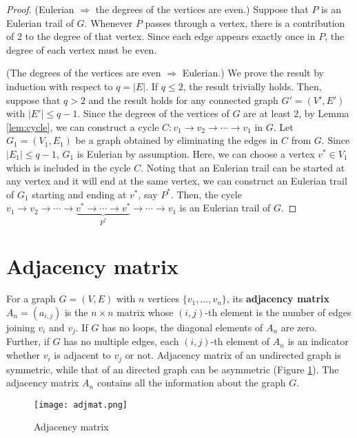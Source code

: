\documentclass[11pt, A4paper, openany, uplatex]{book}
\begin{document}
\begin{appendices}
\begin{proof}
	(Eulerian $\Rightarrow$ the degrees of the vertices are even.) Suppose that $P$ is an Eulerian trail of $G$.
	Whenever $P$ passes through a vertex, there is a contribution of 2 to the degree of that vertex.
	Since each edge appears exactly once in $P$, the degree of each vertex must be even.
	\bigskip
	
	(The degrees of the vertices are even $\Rightarrow$ Eulerian.) We prove the result by induction with respect to $q = |E|$.
	If $q \le 2$, the result trivially holds.
	Then, suppose that $q > 2$ and the result holds for any connected graph $G' = (V', E')$ with $|E'| \le q - 1$.
	Since the degrees of the vertices of $G$ are at least 2, by Lemma \ref{lem:cycle}, we can construct a cycle $C: v_1 \to v_2 \to \cdots \to v_1$ in $G$.
	Let $G_1 = (V_1, E_1)$ be a graph obtained by eliminating the edges in $C$ from $G$.
	Since $|E_1| \le q - 1$, $G_1$ is Eulerian by assumption.
	Here, we can choose a vertex $v^* \in V_1$ which is included in the cycle $C$. 
	Noting that an Eulerian trail can be started at any vertex and it will end at the same vertex, we can construct an Eulerian trail of $G_1$ starting and ending at $v^*$, say $P^*$.
	Then, the cycle $v_1 \to v_2 \to \cdots \to \underbrace{v^* \to \cdots \to v^*}_{P^*} \to \cdots \to v_1$ is an Eulerian trail of $G$.
\end{proof}
\section{Adjacency matrix}\label{sec:adjacency}

For a graph $G = (V, E)$ with $n$ vertices $\{v_1, \ldots, v_n\}$, its \textbf{adjacency matrix} $A_n = (a_{i,j})$ is the $n \times n$ matrix whose $(i,j)$-th element is the number of edges joining $v_i$ and $v_j$.
If $G$ has no loops, the diagonal elements of $A_n$ are zero.
Further, if $G$ has no multiple edges, each $(i,j)$-th element of $A_n$ is an indicator whether $v_i$ is adjacent to $v_j$ or not.
Adjacency matrix of an undirected graph is symmetric, while that of an directed graph can be asymmetric (Figure \ref{fig:adjmat}).
The adjacency matrix $A_n$ contains all the information about the graph $G$.

\begin{figure}[h!]
	\begin{center}
		\texttt{[image: adjmat.png]}
		\caption{Adjacency matrix\label{fig:adjmat}}
	\end{center}
\end{figure}


\end{appendices}
\end{document}
